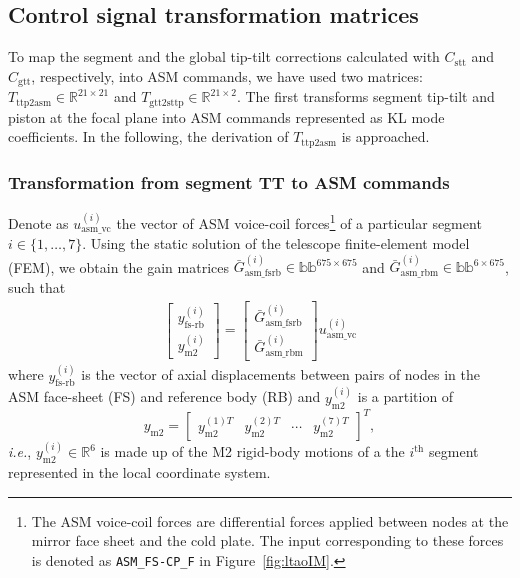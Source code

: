 \documentclass{gmto}
\begin{document}
\subsection{Control signal transformation matrices}

To map the segment and the global tip-tilt corrections calculated with $C_\text{stt}$ and $C_\text{gtt}$, respectively, into ASM commands, we have used two matrices: $T_\text{ttp2asm} \in \mathbb{R}^{21 \times 21}$ and $T_\text{gtt2sttp} \in \mathbb{R}^{21 \times 2}$. The first transforms segment tip-tilt and piston at the focal plane into ASM commands represented as KL mode coefficients. In the following, the derivation of $T_\text{ttp2asm}$ is approached.

\subsubsection*{Transformation from segment TT to ASM commands}

Denote as $u_\text{asm\_vc}^{(i)}$ the vector of ASM voice-coil forces\footnote{The ASM voice-coil forces are differential forces applied between nodes at the mirror face sheet and the cold plate. The input corresponding to these forces is denoted as \texttt{ASM\_FS-CP\_F} in Figure~\ref{fig:ltaoIM}.} of a particular segment $i \in \{1, \ldots, 7\}$. Using the static solution of the telescope finite-element model (FEM), we obtain the gain matrices $\bar{G}_\text{asm\_fsrb}^{(i)} \in \mathbb{bb}^{675 \times 675}$ and $\bar{G}_\text{asm\_rbm}^{(i)} \in \mathbb{bb}^{6 \times 675}$, such that
\begin{align} \label{eq:static_relations}
    \begin{bmatrix}
        y_\text{fs-rb}^{(i)} \\ y_\text{m2}^{(i)}
    \end{bmatrix} = 
    \begin{bmatrix}
        \bar{G}_\text{asm\_fsrb}^{(i)}
        \\ \bar{G}_\text{asm\_rbm}^{(i)}
    \end{bmatrix} u_\text{asm\_vc}^{(i)}
\end{align}
where $y_\text{fs-rb}^{(i)}$ is the vector of axial displacements between pairs of nodes in the ASM face-sheet (FS) and reference body (RB) and $y_\text{m2}^{(i)}$ is a partition of 
$$y_\text{m2} = \begin{bmatrix}
    y_\text{m2}^{(1) T} & y_\text{m2}^{(2) T} & \cdots & y_\text{m2}^{(7) T}
\end{bmatrix}^T,$$
{\it i.e.}, $y_\text{m2}^{(i)} \in \mathbb{R}^6$ is made up of the M2 rigid-body motions of a the $i^\text{th}$ segment represented in the local coordinate system.
\end{document}
